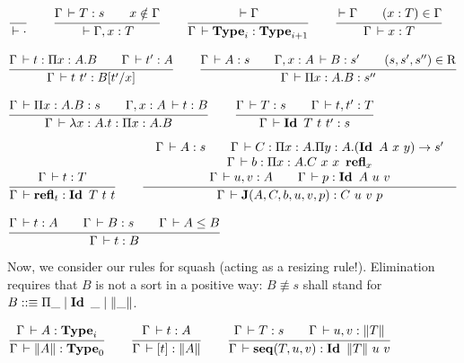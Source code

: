 \documentclass[a4paper,english]{lipics-utf8x}
\begin{document}
  \begin{center}
  \(
    \ru{}{\der \cdot}
    \qquad
    \ru{\Gamma \der T : s \qquad
        x \notin \Gamma
      }{\der \Gamma, x : T}
    \qquad
    \ru{\der \Gamma
      }{\Gamma \der \Type_i : \Type_{i+1}}
    \qquad
    \ru{\der \Gamma \qquad
        (x : T) \in \Gamma
      }{\Gamma \der x : T}
  \)
  \end{center}

  \begin{center}
  \(
    \ru{\Gamma \der t : \Pi x:A.B \qquad
        \Gamma \der t' : A
      }{\Gamma \der t\ t' : B[t'/x]}
    \qquad
    \ru{\Gamma \der A : s \qquad
        \Gamma, x:A \der B : s' \qquad
        (s,s',s'') \in \R
      }{\Gamma \der \Pi x:A.B : s''}
  \)
  \end{center}

  \begin{center}
  \(
    \ru{\Gamma \der \Pi x:A.B : s \qquad
        \Gamma, x:A \der t : B
      }{\Gamma \der \lambda x:A.t : \Pi x:A.B}
    \qquad
    \ru{\Gamma \der T : s \qquad
        \Gamma \der t,t' : T
      }{\Gamma \der \Id T\ t\ t' : s}
  \)
  \end{center}

  \begin{center}
  \(
    \ru{\Gamma \der t : T
      }{\Gamma \der \refl_t : \Id T\ t\ t}
    \qquad
    \tru{\Gamma \der A : s \qquad
         \Gamma \der C : \Pi x:A. \Pi y:A. (\Id A\ x\ y) \to s'
       }{\Gamma \der b : \Pi x:A. C\ x\ x\ \refl_x
       }{\Gamma \der u, v : A \qquad
         \Gamma \der p : \Id A\ u\ v
       }{\Gamma \der \J (A,C,b,u,v,p) : C\ u\ v\ p}
  \)
  \end{center}

  \begin{center}
  \(
    \ru{\Gamma \der t : A \qquad
        \Gamma \der B : s \qquad
        \Gamma \der A \le B
      }{\Gamma \der t : B}
  \)
  \end{center}

  \noindent %
  Now, we consider our rules for squash (acting as a resizing rule!).
  Elimination requires that $B$ is not a sort in a positive way:
  $B \nequiv s$ shall stand for
  $B ::\equiv \Pi \_ \mid \operatorname{\mathbf{Id}~} \_ \mid \|\_\|$.

  \begin{center}
  \(
    \ru{\Gamma \der A : \Type_i
      }{\Gamma \der \squash{A} : \Type_0}
    \qquad
    \ru{\Gamma \der t : A
      }{\Gamma \der [t] : \squash{A}}
    \qquad
    \ru{\Gamma \der T : s \qquad
        \Gamma \der u,v : \squash{T}
      }{\Gamma \der \seq(T,u,v) : \Id \squash{T}\ u\ v}
  \)
  \end{center}
\end{document}
